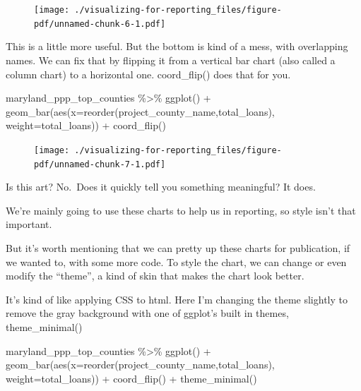 \documentclass[
  letterpaper,
  DIV=11,
  numbers=noendperiod]{scrreprt}
\newenvironment{Shaded}{\begin{snugshade}}{\end{snugshade}}
\newcommand{\AttributeTok}[1]{\textcolor[rgb]{0.40,0.45,0.13}{#1}}
\newcommand{\FunctionTok}[1]{\textcolor[rgb]{0.28,0.35,0.67}{#1}}
\newcommand{\NormalTok}[1]{\textcolor[rgb]{0.00,0.23,0.31}{#1}}
\newcommand{\SpecialCharTok}[1]{\textcolor[rgb]{0.37,0.37,0.37}{#1}}
\begin{document}
\begin{figure}[H]

{\centering \texttt{[image: ./visualizing-for-reporting\_files/figure-pdf/unnamed-chunk-6-1.pdf]}

}

\end{figure}

This is a little more useful. But the bottom is kind of a mess, with
overlapping names. We can fix that by flipping it from a vertical bar
chart (also called a column chart) to a horizontal one. coord\_flip()
does that for you.

\begin{Shaded}
\begin{Highlighting}[]
\NormalTok{maryland\_ppp\_top\_counties }\SpecialCharTok{\%\textgreater{}\%}
  \FunctionTok{ggplot}\NormalTok{() }\SpecialCharTok{+}
  \FunctionTok{geom\_bar}\NormalTok{(}\FunctionTok{aes}\NormalTok{(}\AttributeTok{x=}\FunctionTok{reorder}\NormalTok{(project\_county\_name,total\_loans), }\AttributeTok{weight=}\NormalTok{total\_loans)) }\SpecialCharTok{+}
  \FunctionTok{coord\_flip}\NormalTok{()}
\end{Highlighting}
\end{Shaded}

\begin{figure}[H]

{\centering \texttt{[image: ./visualizing-for-reporting\_files/figure-pdf/unnamed-chunk-7-1.pdf]}

}

\end{figure}

Is this art? No.~Does it quickly tell you something meaningful? It does.

We're mainly going to use these charts to help us in reporting, so style
isn't that important.

But it's worth mentioning that we can pretty up these charts for
publication, if we wanted to, with some more code. To style the chart,
we can change or even modify the ``theme'', a kind of skin that makes
the chart look better.

It's kind of like applying CSS to html. Here I'm changing the theme
slightly to remove the gray background with one of ggplot's built in
themes, theme\_minimal()

\begin{Shaded}
\begin{Highlighting}[]
\NormalTok{maryland\_ppp\_top\_counties }\SpecialCharTok{\%\textgreater{}\%}
  \FunctionTok{ggplot}\NormalTok{() }\SpecialCharTok{+}
  \FunctionTok{geom\_bar}\NormalTok{(}\FunctionTok{aes}\NormalTok{(}\AttributeTok{x=}\FunctionTok{reorder}\NormalTok{(project\_county\_name,total\_loans), }\AttributeTok{weight=}\NormalTok{total\_loans)) }\SpecialCharTok{+}
  \FunctionTok{coord\_flip}\NormalTok{() }\SpecialCharTok{+} 
  \FunctionTok{theme\_minimal}\NormalTok{()}
\end{Highlighting}
\end{Shaded}
\end{document}

